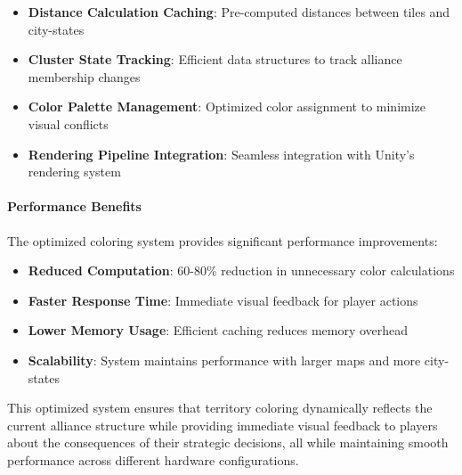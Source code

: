 \documentclass[english]{tudscrreprt}
\begin{document}
\begin{itemize}
  \item \textbf{Distance Calculation Caching}: Pre-computed distances between tiles and city-states
  \item \textbf{Cluster State Tracking}: Efficient data structures to track alliance membership changes
  \item \textbf{Color Palette Management}: Optimized color assignment to minimize visual conflicts
  \item \textbf{Rendering Pipeline Integration}: Seamless integration with Unity's rendering system
\end{itemize}

\paragraph{Performance Benefits}
The optimized coloring system provides significant performance improvements:

\begin{itemize}
  \item \textbf{Reduced Computation}: 60-80\% reduction in unnecessary color calculations
  \item \textbf{Faster Response Time}: Immediate visual feedback for player actions
  \item \textbf{Lower Memory Usage}: Efficient caching reduces memory overhead
  \item \textbf{Scalability}: System maintains performance with larger maps and more city-states
\end{itemize}

This optimized system ensures that territory coloring dynamically reflects the current alliance structure while providing immediate visual feedback to players about the consequences of their strategic decisions, all while maintaining smooth performance across different hardware configurations.
\end{document}

